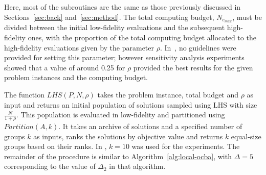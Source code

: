 Here, most of the subroutines are the same as those previously discussed in Sections~\ref{sec:back} and~\ref{sec:method}. The total computing budget, $N_{e_{max}}$, must be divided between the initial low-fidelity evaluations and the subsequent high-fidelity ones, with the proportion of the total computing budget allocated to the high-fidelity evaluations given by the parameter $\rho$. In~\cite{xu2016mo2tos}, no guidelines were provided for setting this parameter; however sensitivity analysis experiments showed that a value of around 0.25 for $\rho$ provided the best results for the given problem instances and the computing budget. 

The function $LHS(P,N,\rho)$ takes the problem instance, total budget and $\rho$ as input and returns an initial population of solutions sampled using LHS with size $\frac{N}{1+\rho}$. This population is evaluated in low-fidelity and partitioned using $Partition(A,k)$. It takes an archive of solutions and a specified number of groups $k$ as inputs, ranks the solutions by objective value and returns $k$ equal-size groups based on their ranks. In \cite{xu2016mo2tos}, $k=10$ was used for the experiments. The remainder of the procedure is similar to Algorithm~\ref{alg:local-ocba}, with $\Delta = 5$ corresponding to the value of $\Delta_2$ in that algorithm.